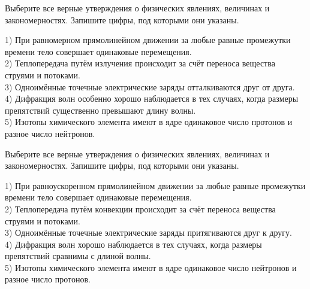 \begin{taskbasic}[code={\label{task:kim18_img1}}]
Выберите все верные утверждения о физических явлениях, величинах и закономерностях. Запишите цифры, под которыми они указаны.

1) При равномерном прямолинейном движении за любые равные промежутки времени тело совершает одинаковые перемещения.\\
2) Теплопередача путём излучения происходит за счёт переноса вещества струями и потоками.\\
3) Одноимённые точечные электрические заряды отталкиваются друг от друга.\\
4) Дифракция волн особенно хорошо наблюдается в тех случаях, когда размеры препятствий существенно превышают длину волны.\\
5) Изотопы химического элемента имеют в ядре одинаковое число протонов и разное число нейтронов.

\end{taskbasic}

\begin{taskbasic}[code={\label{task:kim18_img2}}]
Выберите все верные утверждения о физических явлениях, величинах и закономерностях. Запишите цифры, под которыми они указаны.

1) При равноускоренном прямолинейном движении за любые равные промежутки времени тело совершает одинаковые перемещения.\\
2) Теплопередача путём конвекции происходит за счёт переноса вещества струями и потоками.\\
3) Одноимённые точечные электрические заряды притягиваются друг к другу.\\
4) Дифракция волн хорошо наблюдается в тех случаях, когда размеры препятствий сравнимы с длиной волны.\\
5) Изотопы химического элемента имеют в ядре одинаковое число нейтронов и разное число протонов.

\end{taskbasic}

